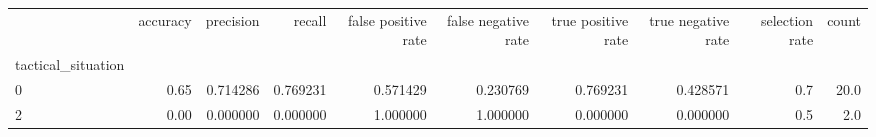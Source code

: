 \begin{tabular}{lrrrrrrrrr}
\toprule
{} &  accuracy &  precision &    recall &  false positive rate &  false negative rate &  true positive rate &  true negative rate &  selection rate &  count \\
tactical\_situation &           &            &           &                      &                      &                     &                     &                 &        \\
\midrule
0                  &      0.65 &   0.714286 &  0.769231 &             0.571429 &             0.230769 &            0.769231 &            0.428571 &             0.7 &   20.0 \\
2                  &      0.00 &   0.000000 &  0.000000 &             1.000000 &             1.000000 &            0.000000 &            0.000000 &             0.5 &    2.0 \\
\bottomrule
\end{tabular}
